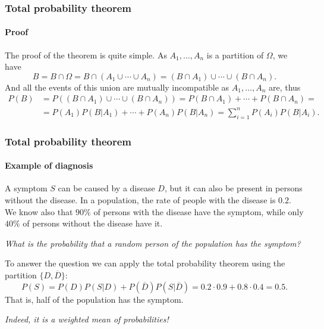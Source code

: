 \begin{frame}
\frametitle{Total probability theorem}
\framesubtitle{Proof}
The proof of the theorem is quite simple.
As $A_1,\ldots,A_n$ is a partition of $\Omega$, we have 
\[
B = B\cap \Omega = B\cap (A_1\cup \cdots \cup A_n) = (B\cap A_1)\cup \cdots \cup (B\cap A_n).
\]
And all the events of this union are mutually incompatible as $A_1,\ldots,A_n$ are, thus
\begin{align*}
P(B) &= P((B\cap A_1)\cup \cdots \cup (B\cap A_n)) = P(B\cap A_1)+\cdots + P(B\cap A_n) =\\
&= P(A_1)P(B|A_1)+\cdots + P(A_n)P(B|A_n) = \sum_{i=1}^n P(A_i)P(B|A_i).
\end{align*}

\begin{center}
\end{center}
\end{frame}


\begin{frame}
\frametitle{Total probability theorem}
\framesubtitle{Example of diagnosis}
A symptom $S$ can be caused by a disease $D$, but it can also be present in persons without the disease.
In a population, the rate of people with the disease is $0.2$. 
We know also that $90\%$ of persons with the disease have the symptom, while only $40\%$ of persons without the disease have it. 

\emph{What is the probability that a random person of the population has the symptom?}

To answer the question we can apply the total probability theorem using the partition $\{D,\overline D\}$:
\[
P(S) = P(D)P(S|D)+P(\overline D)P(S|\overline D) = 0.2\cdot 0.9 + 0.8\cdot 0.4 = 0.5.
\]
That is, half of the population has the symptom. 

\begin{center}
\emph{Indeed, it is a weighted mean of probabilities!}
\end{center}
\end{frame}


